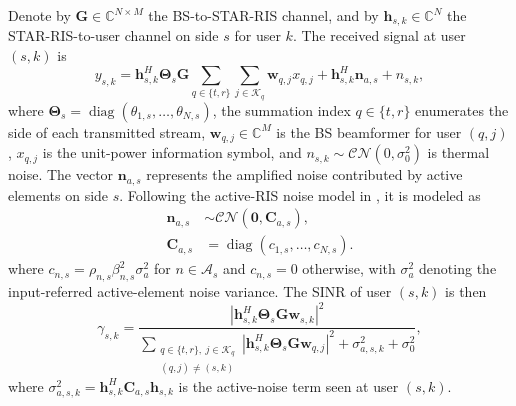 \documentclass[journal]{IEEEtran}
\DeclareMathOperator{\diag}{diag}
\begin{document}
Denote by $\mathbf{G}\in\mathbb{C}^{N\times M}$ the BS-to-STAR-RIS channel, and by $\mathbf{h}_{s,k}\in\mathbb{C}^N$ the STAR-RIS-to-user channel on side $s$ for user $k$. The received signal at user $(s,k)$ is
\begin{equation}
y_{s,k}=\mathbf{h}_{s,k}^H\mathbf{\Theta}_s\mathbf{G}
\sum_{q\in\{t,r\}}\sum_{j\in\mathcal{K}_{q}}\mathbf{w}_{q,j}x_{q,j}
+\mathbf{h}_{s,k}^H\mathbf{n}_{a,s}+n_{s,k},
\label{eq:received}
\end{equation}
where $\mathbf{\Theta}_s=\diag(\theta_{1,s},\ldots,\theta_{N,s})$, the summation index $q\in\{t,r\}$ enumerates the side of each transmitted stream, $\mathbf{w}_{q,j}\in\mathbb{C}^{M}$ is the BS beamformer for user $(q,j)$, $x_{q,j}$ is the unit-power information symbol, and $n_{s,k}\sim\mathcal{CN}(0,\sigma_0^2)$ is thermal noise. The vector $\mathbf{n}_{a,s}$ represents the amplified noise contributed by active elements on side $s$. Following the active-RIS noise model in \cite{zhang2022signal,ma2023activeee}, it is modeled as
\begin{equation}
\begin{aligned}
\mathbf{n}_{a,s} &\sim \mathcal{CN}(\mathbf{0},\mathbf{C}_{a,s}),\\
\mathbf{C}_{a,s} &= \diag(c_{1,s},\ldots,c_{N,s}).
\end{aligned}
\label{eq:na_stat}
\end{equation}
where $c_{n,s}=\rho_{n,s}\beta_{n,s}^2\sigma_a^2$ for $n\in\mathcal{A}_s$ and $c_{n,s}=0$ otherwise, with $\sigma_a^2$ denoting the input-referred active-element noise variance. The SINR of user $(s,k)$ is then
\begin{equation}
\gamma_{s,k}=
\frac{\left|\mathbf{h}_{s,k}^H\mathbf{\Theta}_s\mathbf{G}\mathbf{w}_{s,k}\right|^2}
{\sum_{\substack{q\in\{t,r\},\ j\in\mathcal{K}_{q}\\(q,j)\ne(s,k)}}
\left|\mathbf{h}_{s,k}^H\mathbf{\Theta}_s\mathbf{G}\mathbf{w}_{q,j}\right|^2
+\sigma_{a,s,k}^2+\sigma_0^2},
\label{eq:sinr_full}
\end{equation}
where $\sigma_{a,s,k}^2=\mathbf{h}_{s,k}^H\mathbf{C}_{a,s}\mathbf{h}_{s,k}$ is the active-noise term seen at user $(s,k)$.
\end{document}
